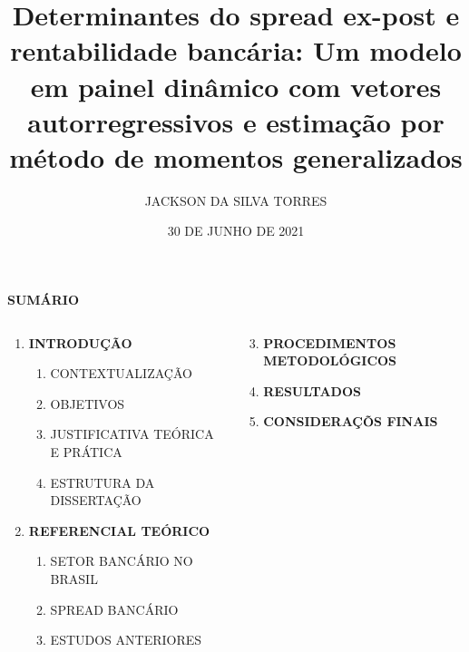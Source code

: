 \documentclass[
  ignorenonframetext,
  aspectratio=169,
  ignorenonframetext]{beamer}
\title{Determinantes do \textbf{spread ex-post} e rentabilidade
bancária: Um modelo em painel dinâmico com vetores autorregressivos e
estimação por método de momentos generalizados}
\author{JACKSON DA SILVA TORRES}
\date{30 DE JUNHO DE 2021}
\begin{document}
\frame{\titlepage}

\begin{frame}{\textbf{SUMÁRIO }}
\protect\hypertarget{sumuxe1rio}{}
\begin{columns}[T]
\begin{column}{0.6\textwidth}
\begin{enumerate}
\item
  \textbf{INTRODUÇÃO}

  \begin{enumerate}
  \item
    CONTEXTUALIZAÇÃO
  \item
    OBJETIVOS
  \item
    JUSTIFICATIVA TEÓRICA E PRÁTICA
  \item
    ESTRUTURA DA DISSERTAÇÃO
  \end{enumerate}
\item
  \textbf{REFERENCIAL TEÓRICO}

  \begin{enumerate}
  \item
    SETOR BANCÁRIO NO BRASIL
  \item
    SPREAD BANCÁRIO
  \item
    ESTUDOS ANTERIORES
  \end{enumerate}
\end{enumerate}
\end{column}

\begin{column}{0.4\textwidth}
\begin{enumerate}
\setcounter{enumi}{2}
\item
  \textbf{PROCEDIMENTOS METODOLÓGICOS}
\item
  \textbf{RESULTADOS}
\item
  \textbf{CONSIDERAÇÕS FINAIS}
\end{enumerate}
\end{column}
\end{columns}
\end{frame}
\end{document}
